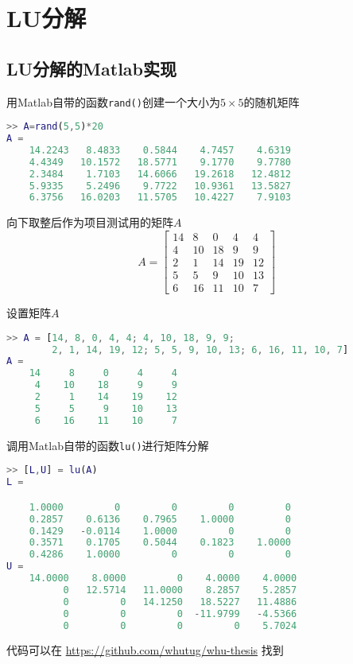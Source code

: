 \chapter{LU分解}

\section{LU分解的Matlab实现}
用Matlab自带的函数\lstinline|rand()|创建一个大小为$5\times 5$的随机矩阵


\begin{lstlisting}[language=Matlab]  
>> A=rand(5,5)*20
A =
    14.2243   8.4833    0.5844    4.7457    4.6319
    4.4349   10.1572   18.5771    9.1770    9.7780
    2.3484    1.7103   14.6066   19.2618   12.4812
    5.9335    5.2496    9.7722   10.9361   13.5827
    6.3756   16.0203   11.5705   10.4227    7.9103
\end{lstlisting}


向下取整后作为项目测试用的矩阵$A$
\begin{equation}
    A=\begin{bmatrix}
        14 & 8  & 0  & 4  & 4  \\
        4  & 10 & 18 & 9  & 9  \\
        2  & 1  & 14 & 19 & 12 \\
        5  & 5  & 9  & 10 & 13 \\
        6  & 16 & 11 & 10 & 7
    \end{bmatrix}
\end{equation}

设置矩阵$A$
\begin{lstlisting}[language=Matlab]  
>> A = [14, 8, 0, 4, 4; 4, 10, 18, 9, 9;
        2, 1, 14, 19, 12; 5, 5, 9, 10, 13; 6, 16, 11, 10, 7]
A =
    14     8     0     4     4
     4    10    18     9     9
     2     1    14    19    12
     5     5     9    10    13
     6    16    11    10     7
\end{lstlisting}

调用Matlab自带的函数\lstinline|lu()|进行矩阵分解
\begin{lstlisting}[language=Matlab]  
>> [L,U] = lu(A)
L =

    1.0000         0         0         0         0
    0.2857    0.6136    0.7965    1.0000         0
    0.1429   -0.0114    1.0000         0         0
    0.3571    0.1705    0.5044    0.1823    1.0000
    0.4286    1.0000         0         0         0
U =
    14.0000    8.0000         0    4.0000    4.0000
          0   12.5714   11.0000    8.2857    5.2857
          0         0   14.1250   18.5227   11.4886
          0         0         0  -11.9799   -4.5366
          0         0         0         0    5.7024
\end{lstlisting}

代码可以在 {\url{https://github.com/whutug/whu-thesis}} 找到